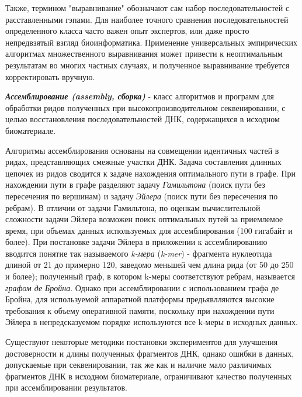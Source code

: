 Также, термином "выравнивание" обозначают сам набор последовательностей с расставленными гэпами. Для наиболее точного сравнения последовательностей определенного класса часто важен опыт экспертов, или даже просто непредвзятый взгляд биоинформатика. Применение универсальных эмпирических алгоритмах множественного выравнивания может привести к неоптимальным результатам во многих частных случаях, и полученное выравнивание требуется корректировать вручную.

\noindent
\textbf{ \textit{Ассемблирование (assembly, сборка)} } - класс алгоритмов и программ для обработки ридов полученных при высокопроизводительном секвенировании, с целью восстановления последовательностей ДНК, содержащихся в исходном биоматериале.

Алгоритмы ассемблирования основаны на совмещении идентичных частей в ридах, представляющих смежные участки ДНК. Задача составления длинных цепочек из ридов сводится к задаче нахождения оптимального пути в графе. При нахождении пути в графе разделяют задачу  \textit{Гамильтона} (поиск пути без пересечения по вершинам) и задачу \textit{Эйлера} (поиск пути без пересечения по ребрам). В отличии от задачи Гамильтона, по оценкам вычислительной сложности задачи Эйлера возможен поиск оптимальных путей за приемлемое время, при объемах данных используемых для ассемблирования (100 гигабайт и более). При постановке задачи Эйлера в приложении к ассемблированию вводится понятие так называемого \textit{k-мера} (\textit{k-mer}) - фрагмента нуклеотида длиной от 21 до примерно 120, заведомо меньшей чем длина рида (от 50 до 250 и более); полученный граф, в котором k-меры соответствуют ребрам, называется \textit{графом де Бройна}. Однако при ассемблировании с использованием графа де Бройна, для используемой аппаратной платформы предьявлляются высокие требования к объему оперативной памяти, поскольку при нахождении пути Эйлера в непредсказуемом порядке используются все k-меры в исходных данных. 

Существуют некоторые методики постановки экспериментов для улучшения достоверности и длины полученных фрагментов ДНК, однако ошибки в данных, допускаемые при секвенировании, так же как и наличие мало различимых фрагментов ДНК в исходном биоматериале, ограничивают качество полученных при ассемблировании результатов.


